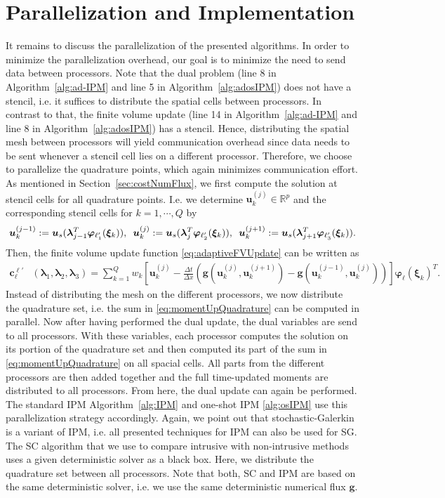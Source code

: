\section{Parallelization and Implementation}
\label{sec:parallel}
It remains to discuss the parallelization of the presented algorithms. In order to minimize the parallelization overhead, our goal is to minimize the need to send data between processors. Note that the dual problem (line 8 in Algorithm~\ref{alg:ad-IPM} and line 5 in Algorithm~\ref{alg:adosIPM}) does not have a stencil, i.e. it suffices to distribute the spatial cells between processors. In contrast to that, the finite volume update (line 14 in Algorithm~\ref{alg:ad-IPM} and line 8 in Algorithm~\ref{alg:adosIPM}) has a stencil. Hence, distributing the spatial mesh between processors will yield communication overhead since data needs to be sent whenever a stencil cell lies on a different processor. Therefore, we choose to parallelize the quadrature points, which again minimizes communication effort. As mentioned in Section~\ref{sec:costNumFlux}, we first compute the solution at stencil cells for all quadrature points. I.e. we determine $\bm u^{(j)}_k\in\mathbb{R}^p$ and the corresponding stencil cells for $k = 1,\cdots,Q$ by
\begin{align*}
\bm u^{(j-1)}_k := \bm u_{s}(\bm{\lambda}_{j-1}^T\bm{\varphi}_{\ell_1'}(\bm \xi_k)), \enskip \bm u^{(j)}_k := \bm u_{s}(\bm{\lambda}_{j}^T\bm{\varphi}_{\ell_2'}(\bm \xi_k)), \enskip \bm u^{(j+1)}_k := \bm u_{s}(\bm{\lambda}_{j+1}^T\bm{\varphi}_{\ell_3'}(\bm \xi_k)).
\end{align*}
Then, the finite volume update function \eqref{eq:adaptiveFVUpdate} can be written as
\begin{align}\label{eq:momentUpQuadrature}
\bm{c}_{\ell}^{\bm{\ell}'}&\left(\bm{\lambda}_{1},\bm{\lambda}_2,\bm{\lambda}_3\right)=\sum_{k=1}^Q w_k \left[\bm u^{(j)}_k- \frac{\Delta t}{\Delta x}\left(\bm g( \bm u^{(j)}_k,\bm u^{(j+1)}_k )- \bm g( \bm u^{(j-1)}_k,\bm u^{(j)}_k )\right)\right]\bm{\varphi}_{\ell}(\bm \xi_k)^T.
\end{align}
Instead of distributing the mesh on the different processors, we now distribute the quadrature set, i.e. the sum in \eqref{eq:momentUpQuadrature} can be computed in parallel. Now after having performed the dual update, the dual variables are send to all processors. With these variables, each processor computes the solution on its portion of the quadrature set and then computed its part of the sum in \eqref{eq:momentUpQuadrature} on all spacial cells. All parts from the different processors are then added together and the full time-updated moments are distributed to all processors. From here, the dual update can again be performed. The standard IPM Algorithm~\ref{alg:IPM} and one-shot IPM \ref{alg:osIPM} use this parallelization strategy accordingly. Again, we point out that stochastic-Galerkin is a variant of IPM, i.e. all presented techniques for IPM can also be used for SG. The SC algorithm that we use to compare intrusive with non-intrusive methods uses a given deterministic solver as a black box. Here, we distribute the quadrature set between all processors. Note that both, SC and IPM are based on the same deterministic solver, i.e. we use the same deterministic numerical flux $\bm g$. 
